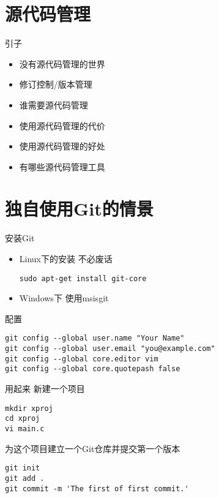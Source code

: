 \part{源代码管理}
\begin{frame}[<+->]{引子}
\begin{itemize}
  \item 没有源代码管理的世界
  \item 修订控制/版本管理
  \item 谁需要源代码管理
  \item 使用源代码管理的代价
  \item 使用源代码管理的好处
  \item 有哪些源代码管理工具
\end{itemize}
\end{frame}

\part{独自使用Git的情景}
\begin{frame}[<+->][fragile]{安装Git}
\begin{itemize}
  \item Linux下的安装
  不必废话
\begin{Verbatim}[frame=single,commandchars=\\\{\}]
sudo apt-get install git-core
\end{Verbatim}

  \item Windows下
  使用msisgit
\end{itemize}
\end{frame}

\begin{frame}[<+->][fragile]{配置}
\begin{Verbatim}[frame=single,commandchars=\\\{\}]
git config --global user.name "Your Name"
git config --global user.email "you@example.com"
git config --global core.editor vim
git config --global core.quotepash false
\end{Verbatim}
\end{frame}

\begin{frame}[<+->][fragile]{用起来}
\onslide<+->
新建一个项目
\begin{Verbatim}[frame=single,commandchars=\\\{\}]
mkdir xproj
cd xproj
vi main.c
\end{Verbatim}

\onslide<+->
为这个项目建立一个Git仓库并提交第一个版本
\begin{Verbatim}[frame=single,commandchars=\\\{\}]
git init
git add .
git commit -m 'The first of first commit.'
\end{Verbatim}
\end{frame}


